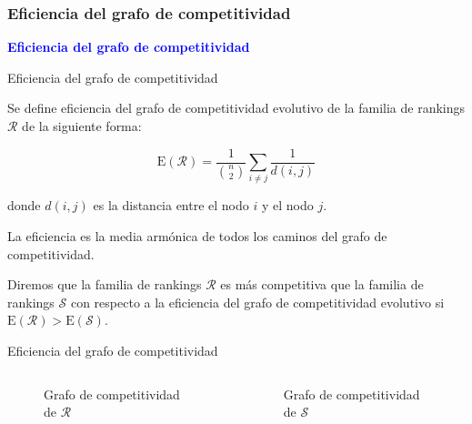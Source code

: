 \documentclass[10pt]{beamer}
\begin{document}
	\subsubsection{Eficiencia del grafo de competitividad}
	
	\begin{frame}
		\begin{center}
			\Huge\textbf{\textsf{\textcolor{blue}{Eficiencia del grafo de competitividad}}}
		\end{center}
	\end{frame}
	
	\begin{frame}{Eficiencia del grafo de competitividad}
		\begin{defi}
			Se define eficiencia del grafo de competitividad evolutivo de la familia de rankings $\mathcal{R}$ de la siguiente forma:
			
			\begin{equation}
			\mathrm{E}(\mathcal{R}) = \dfrac{1}{\binom{n}{2}} \sum_{i\neq j} \dfrac{1}{d(i,j)}
			\end{equation}
			
			donde $d(i,j)$ es la distancia entre el nodo $i$ y el nodo $j$.
		\end{defi}
		
		La eficiencia es la media armónica de todos los caminos del grafo de competitividad.
		
		\begin{defi}
			Diremos que la familia de rankings $\mathcal{R}$ es más competitiva que la familia de rankings $\mathcal{S}$ con respecto a la eficiencia del grafo de competitividad evolutivo si $\mathrm{E}(\mathcal{R}) > \mathrm{E}(\mathcal{S})$.
		\end{defi}
	\end{frame}
	
	\begin{frame}{Eficiencia del grafo de competitividad}
		\begin{ejemplo}
			\begin{columns}[t] %
				\begin{column}{.50\textwidth}
					\begin{figure}
						\centering
						\resizebox{!}{0.4\textheight}{\ejemplografocompetitividadevolutivo}
						\caption{Grafo de competitividad de $\mathcal{R}$}
					\end{figure}
				\end{column}%
				\hfill%
				\begin{column}{.50\textwidth}
					\begin{figure}
						\centering
						\resizebox{!}{0.4\textheight}{\ejemplofuerzamedia}
						\caption{Grafo de competitividad de $\mathcal{S}$}
					\end{figure}
				\end{column}%
			\end{columns}
		\end{ejemplo}
	\end{frame}
	
\end{document}
